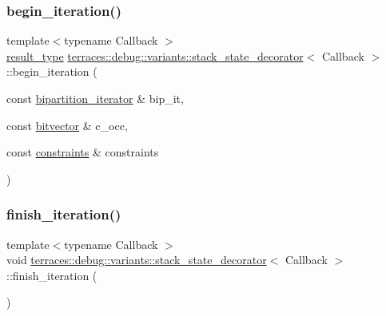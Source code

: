 \mbox{\label{classterraces_1_1debug_1_1variants_1_1stack__state__decorator_ac650dee955aa719620f14c93ed67820d}} 
\subsubsection{\texorpdfstring{begin\+\_\+iteration()}{begin\_iteration()}}
{\footnotesize\ttfamily template$<$typename Callback $>$ \\
\hyperlink{classterraces_1_1debug_1_1variants_1_1stack__state__decorator_a01062643b31a3124c3e77d409f112785}{result\+\_\+type} \hyperlink{classterraces_1_1debug_1_1variants_1_1stack__state__decorator}{terraces\+::debug\+::variants\+::stack\+\_\+state\+\_\+decorator}$<$ Callback $>$\+::begin\+\_\+iteration (\begin{DoxyParamCaption}\item[{const \hyperlink{classterraces_1_1bipartition__iterator}{bipartition\+\_\+iterator} \&}]{bip\+\_\+it,  }\item[{const \hyperlink{namespaceterraces_a1b526fb554dff829f7ad51eb21d5ed06}{bitvector} \&}]{c\+\_\+occ,  }\item[{const \hyperlink{namespaceterraces_a6f603ffd30ed4d902fce6424492e0581}{constraints} \&}]{constraints }\end{DoxyParamCaption})\hspace{0.3cm}{\ttfamily [inline]}}

\mbox{\label{classterraces_1_1debug_1_1variants_1_1stack__state__decorator_ac09a4841c6a5b236ae9bd3ec8bf39b77}} 
\subsubsection{\texorpdfstring{finish\+\_\+iteration()}{finish\_iteration()}}
{\footnotesize\ttfamily template$<$typename Callback $>$ \\
void \hyperlink{classterraces_1_1debug_1_1variants_1_1stack__state__decorator}{terraces\+::debug\+::variants\+::stack\+\_\+state\+\_\+decorator}$<$ Callback $>$\+::finish\+\_\+iteration (\begin{DoxyParamCaption}{ }\end{DoxyParamCaption})\hspace{0.3cm}{\ttfamily [inline]}}

